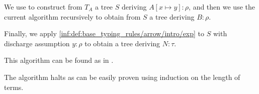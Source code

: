 \begin{algorithm}
\begin{thmenum}
\begin{thmenum}
      We use  to construct from \( T_A \) a tree \( S \) deriving \( A[x \mapsto y]: \rho \), and then we use the current algorithm recursively to obtain from \( S \) a tree deriving \( B: \rho \).

      Finally, we apply  \ref{inf:def:base_typing_rules/arrow/intro/exp} to \( S \) with discharge assumption \( y: \rho \) to obtain a tree deriving \( N: \tau \).
    \end{thmenum}
  \end{thmenum}
\end{algorithm}
\begin{comments}
  \item This algorithm can be found as  in \cite{notebook:code}.
\end{comments}
\begin{defproof}
  The algorithm halts as can be easily proven using induction on the length of terms.
\end{defproof}

